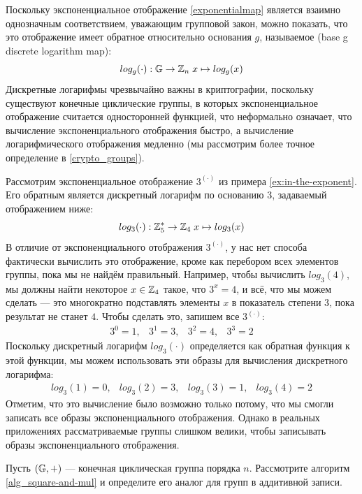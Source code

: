 Поскольку экспоненциальное отображение \eqref{exponentialmap} является взаимно однозначным соответствием, уважающим групповой закон, можно показать, что это отображение имеет обратное относительно основания $g$, называемое  (base g discrete logarithm map):
\begin{equation}
\label{logarithm_map}
log_g(\cdot): \mathbb{G} \to \mathbb{Z}_n\; x \mapsto log_g(x)
\end{equation}
Дискретные логарифмы чрезвычайно важны в криптографии, поскольку существуют конечные циклические группы, в которых экспоненциальное отображение считается односторонней функцией, что неформально означает, что вычисление экспоненциального отображения быстро, а вычисление логарифмического отображения медленно (мы рассмотрим более точное определение в \ref{crypto_groups}).
\begin{example}Рассмотрим экспоненциальное отображение $3^{(\cdot)}$ из примера \ref{ex:in-the-exponent}. Его обратным является дискретный логарифм по основанию $3$, задаваемый отображением ниже:
$$
log_3(\cdot): \mathbb{Z}_5^* \to \mathbb{Z}_4\; x \mapsto log_3(x)
$$ 
В отличие от экспоненциального отображения $3^{(\cdot)}$, у нас нет способа фактически вычислить это отображение, кроме как перебором всех элементов группы, пока мы не найдём правильный. Например, чтобы вычислить $log_3(4)$, мы должны найти некоторое $x\in \mathbb{Z}_4$ такое, что $3^x=4$, и всё, что мы можем сделать — это многократно подставлять элементы $x$ в показатель степени $3$, пока результат не станет $4$. Чтобы сделать это, запишем все  $3^{(\cdot)}$: 
$$
\begin{array}{cccc}
3^0 = 1, & 3^1 = 3, & 3^2 = 4, & 3^3 = 2
\end{array}
$$
Поскольку дискретный логарифм $log_3(\cdot)$ определяется как обратная функция к этой функции, мы можем использовать эти образы для вычисления дискретного логарифма:
$$
\begin{array}{ccccc}
log_3(1) = 0, & log_3(2) = 3, & log_3(3) = 1, & log_3(4) = 2
\end{array}
$$
Отметим, что это вычисление было возможно только потому, что мы смогли записать все образы экспоненциального отображения. Однако в реальных приложениях рассматриваемые группы слишком велики, чтобы записывать образы экспоненциального отображения. 
\end{example}
\begin{exercise}
\label{alg_double-and-add} Пусть $(\mathbb{G},+)$ — конечная циклическая группа порядка $n$. Рассмотрите алгоритм \ref{alg_square-and-mul} и определите его аналог для групп в аддитивной записи.
\end{exercise}


